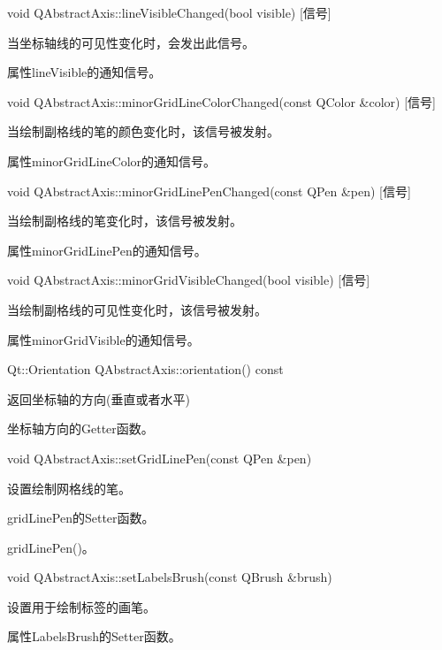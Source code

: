 void QAbstractAxis::lineVisibleChanged(bool visible) [信号] 

当坐标轴线的可见性变化时，会发出此信号。

\begin{notice}
属性lineVisible的通知信号。
\end{notice}

void QAbstractAxis::minorGridLineColorChanged(const QColor \&color)
[信号]

 当绘制副格线的笔的颜色变化时，该信号被发射。 

\begin{notice}
属性minorGridLineColor的通知信号。
\end{notice}

void QAbstractAxis::minorGridLinePenChanged(const QPen \&pen) [信号] 

当绘制副格线的笔变化时，该信号被发射。 

\begin{notice}
属性minorGridLinePen的通知信号。
\end{notice}

void QAbstractAxis::minorGridVisibleChanged(bool visible) [信号] 

当绘制副格线的可见性变化时，该信号被发射。 

\begin{notice}
属性minorGridVisible的通知信号。
\end{notice}

Qt::Orientation QAbstractAxis::orientation() const 

返回坐标轴的方向(垂直或者水平) 

\begin{notice}
坐标轴方向的Getter函数。
\end{notice}

void QAbstractAxis::setGridLinePen(const QPen \&pen) 

设置绘制网格线的笔。 

\begin{notice}
gridLinePen的Setter函数。
\end{notice}

\begin{notice}[另请参阅]
gridLinePen()。
\end{notice}

void QAbstractAxis::setLabelsBrush(const QBrush \&brush)

设置用于绘制标签的画笔。 

\begin{notice}
属性LabelsBrush的Setter函数。
\end{notice}


